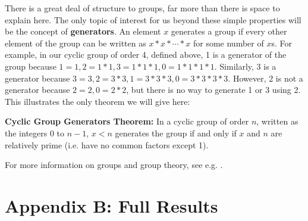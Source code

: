 \documentclass[man,10pt]{apa6}
\begin{document}
There is a great deal of structure to groups, far more than there is space to explain here. The only topic of interest for us beyond these simple properties will be the concept of \textbf{generators}. An element $x$ generates a group if every other element of the group can be written as $x*x*\cdots*x$ for some number of $x$s. For example, in our cyclic group of order 4, defined above, 1 is a generator of the group because $1 = 1, 2 = 1 * 1, 3 = 1 * 1 * 1, 0 = 1 * 1 * 1 * 1$. Similarly, 3 is a generator because $3 = 3, 2 = 3 * 3, 1 = 3 * 3 * 3, 0 = 3 * 3 * 3 * 3$. However, 2 is not a generator because $2 = 2, 0 = 2 * 2$, but there is no way to generate 1 or 3 using 2. This illustrates the only theorem we will give here: \par
\textbf{Cyclic Group Generators Theorem:} In a cyclic group of order $n$, written as the integers $0$ to $n-1$, $x < n$ generates the group if and only if $x$ and $n$ are relatively prime (i.e. have no common factors except 1). \par 
For more information on groups and group theory, see e.g. \cite{Lang2002}.
\onecolumn
\clearpage
\section{Appendix B: Full Results}
\end{document}
